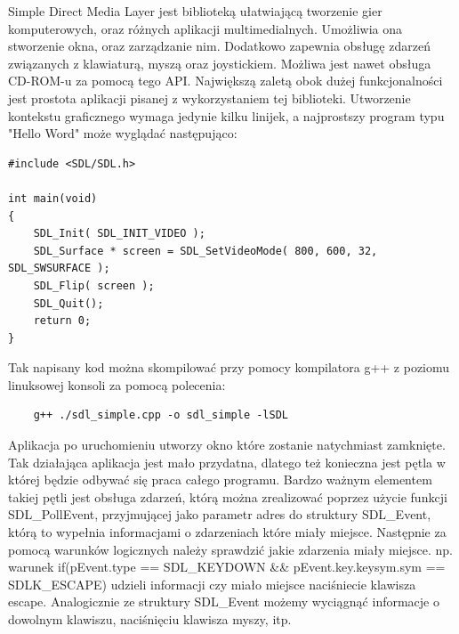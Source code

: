 Simple Direct Media Layer jest biblioteką ułatwiającą tworzenie gier komputerowych, oraz różnych aplikacji multimedialnych. Umożliwia ona stworzenie okna, oraz zarządzanie nim. Dodatkowo zapewnia obsługę zdarzeń związanych z klawiaturą, myszą oraz joystickiem. Możliwa jest nawet obsługa CD-ROM-u za pomocą tego API. Największą zaletą obok dużej funkcjonalności jest prostota aplikacji pisanej z wykorzystaniem tej biblioteki. Utworzenie kontekstu graficznego wymaga jedynie kilku linijek, a najprostszy program typu "Hello Word" może wyglądać następująco:

\begingroup
\fontsize{10pt}{12pt}\selectfont
\begin{verbatim} 
#include <SDL/SDL.h>

int main(void)
{
    SDL_Init( SDL_INIT_VIDEO );
    SDL_Surface * screen = SDL_SetVideoMode( 800, 600, 32, SDL_SWSURFACE );
    SDL_Flip( screen );
    SDL_Quit();
    return 0;
}
\end{verbatim}
\endgroup
Tak napisany kod można skompilować przy pomocy kompilatora g++ z poziomu linuksowej konsoli za pomocą polecenia:
\begin{verbatim} 
	g++ ./sdl_simple.cpp -o sdl_simple -lSDL
\end{verbatim}

Aplikacja po uruchomieniu utworzy okno które zostanie natychmiast zamknięte. Tak działająca aplikacja jest mało przydatna, dlatego też konieczna jest pętla w której będzie odbywać się praca całego programu. Bardzo ważnym elementem takiej pętli jest obsługa zdarzeń, którą można zrealizować poprzez użycie funkcji SDL\_PollEvent, przyjmującej jako parametr adres do struktury SDL\_Event, którą to wypełnia informacjami o zdarzeniach które miały miejsce. Następnie za pomocą warunków logicznych należy sprawdzić jakie zdarzenia miały miejsce. np. warunek if(pEvent.type == SDL\_KEYDOWN \&\& pEvent.key.keysym.sym == SDLK\_ESCAPE)  
udzieli informacji czy miało miejsce naciśniecie klawisza escape. Analogicznie ze struktury SDL\_Event możemy wyciągnąć informacje o dowolnym klawiszu, naciśnięciu klawisza myszy, itp. 

